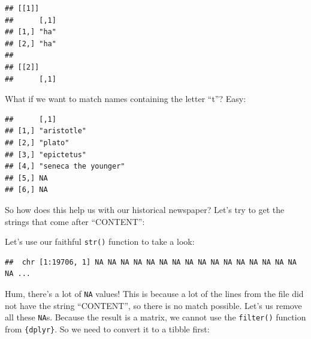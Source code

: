 \documentclass[]{gitbook}
\newenvironment{Shaded}{\begin{snugshade}}{\end{snugshade}}
\newcommand{\KeywordTok}[1]{\textcolor[rgb]{0.13,0.29,0.53}{\textbf{#1}}}
\newcommand{\NormalTok}[1]{#1}
\newcommand{\OperatorTok}[1]{\textcolor[rgb]{0.81,0.36,0.00}{\textbf{#1}}}
\newcommand{\StringTok}[1]{\textcolor[rgb]{0.31,0.60,0.02}{#1}}
\begin{document}
\begin{verbatim}
## [[1]]
##      [,1]
## [1,] "ha"
## [2,] "ha"
## 
## [[2]]
##      [,1]
\end{verbatim}

What if we want to match names containing the letter ``t''? Easy:

\begin{Shaded}
\end{Shaded}

\begin{verbatim}
##      [,1]                
## [1,] "aristotle"         
## [2,] "plato"             
## [3,] "epictetus"         
## [4,] "seneca the younger"
## [5,] NA                  
## [6,] NA
\end{verbatim}

So how does this help us with our historical newspaper? Let's try to get the strings that come
after ``CONTENT'':

\begin{Shaded}
\end{Shaded}

Let's use our faithful \texttt{str()} function to take a look:

\begin{Shaded}
\end{Shaded}

\begin{verbatim}
##  chr [1:19706, 1] NA NA NA NA NA NA NA NA NA NA NA NA NA NA NA NA NA ...
\end{verbatim}

Hum, there's a lot of \texttt{NA} values! This is because a lot of the lines from the file did not have the
string ``CONTENT'', so there is no match possible. Let's us remove all these \texttt{NA}s. Because the
result is a matrix, we cannot use the \texttt{filter()} function from \texttt{\{dplyr\}}. So we need to convert it
to a tibble first:
\end{document}
